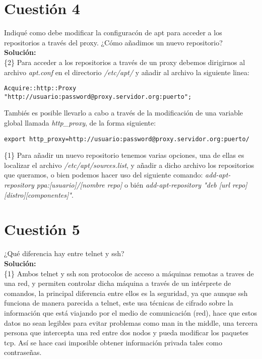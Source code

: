 \documentclass[a4paper, 11pt]{article} %
\begin{document}
\section{Cuestión 4}
Indiqué como debe modificar la configuracón de apt para acceder a los repositorios a través del proxy. ¿Cómo añadimos un nuevo repositorio?\\
\textbf{Solución:}\\
\{2\} Para acceder a los repositorios a través de un proxy debemos dirigirnos al archivo \textit{apt.conf} en el directorio \textit{/etc/apt/} y añadir al archivo la siguiente linea:
\begin{verbatim}
Acquire::http::Proxy "http://usuario:password@proxy.servidor.org:puerto";
\end{verbatim}
Tambiés es posible llevarlo a cabo a través de la modificación de una variable global llamada \textit{http\_proxy}, de la forma siguiente:
\begin{verbatim}
export http_proxy=http://usuario:password@proxy.servidor.org:puerto/
\end{verbatim}
\{1\} Para añadir un nuevo repositorio tenemos varias opciones, una de ellas es localizar el archivo \textit{/etc/apt/sources.list}, y añadir a dicho archivo los repositorios que queramos, o bien podemos hacer uso del siguiente comando:
\textit{add-apt-repository ppa:[usuario]/[nombre repo]} o bién \textit{add-apt-repository "deb [url repo][distro][componentes]"}.

\section{Cuestión 5}
¿Qué diferencia hay entre telnet y ssh?\\
\textbf{Solución:}\\
\{1\} Ambos telnet y ssh son protocolos de acceso a máquinas remotas a traves de una red, y permiten controlar dicha máquina a través de un intérprete de comandos, la principal diferencia entre ellos es la seguridad, ya que aunque ssh funciona de manera parecida a telnet, este usa técnicas de cifrado sobre la información que está viajando por el medio de comunicación (red), hace que estos datos no sean legibles para evitar problemas como man in the middle, una tercera persona que intercepta una red entre dos nodos y pueda modificar los paquetes tcp. Así se hace casi imposible obtener información privada tales como contraseñas.
\end{document}
